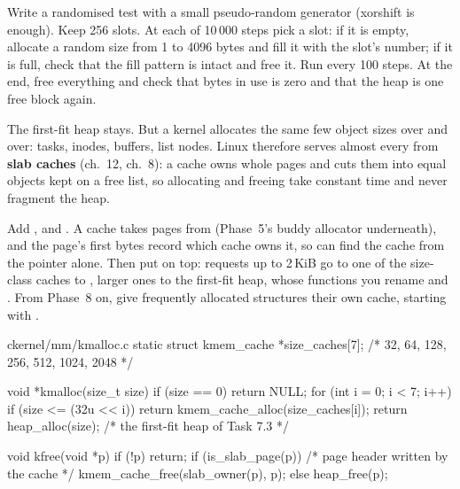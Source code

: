 \documentclass[11pt,a4paper]{article}
\begin{document}
Write a randomised test with a small pseudo-random generator (xorshift is enough). Keep 256 slots. At each of 10\,000
steps pick a slot: if it is empty, allocate a random size from 1 to 4096 bytes and fill it with the slot's number; if
it is full, check that the fill pattern is intact and free it. Run  every 100 steps. At the end,
free everything and check that bytes in use is zero and that the heap is one free block again.

The first-fit heap stays. But a kernel allocates the same
few object sizes over and over: tasks, inodes, buffers, list nodes. Linux therefore serves almost every
 from \textbf{slab caches} (\LKD ch.~12, \LKP ch.~8): a cache owns whole pages and cuts them into equal
objects kept on a free list, so allocating and freeing take constant time and never fragment the heap.

Add ,  and . A cache takes pages
from  (Phase~5's buddy allocator underneath), and the page's first bytes record which cache owns it,
so  can find the cache from the pointer alone. Then put  on top: requests up to 2\,KiB go to
one of the size-class caches  to , larger ones to the first-fit heap, whose functions
you rename  and . From Phase~8
on, give frequently allocated structures their own cache, starting with .

\begin{lst}{c}{kernel/mm/kmalloc.c}
static struct kmem_cache *size_caches[7];       /* 32, 64, 128, 256, 512, 1024, 2048 */

void *kmalloc(size_t size)
{
    if (size == 0)
        return NULL;
    for (int i = 0; i < 7; i++)
        if (size <= (32u << i))
            return kmem_cache_alloc(size_caches[i]);
    return heap_alloc(size);                    /* the first-fit heap of Task 7.3 */
}

void kfree(void *p)
{
    if (!p)
        return;
    if (is_slab_page(p))                        /* page header written by the cache */
        kmem_cache_free(slab_owner(p), p);
    else
        heap_free(p);
}
\end{lst}
\end{document}
